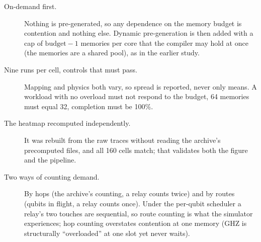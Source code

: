 \begin{description}
  \item[On-demand first.] Nothing is pre-generated, so any dependence on the memory budget is contention and nothing else. Dynamic pre-generation is then added with a cap of $\text{budget}-1$ memories per core that the compiler may hold at once (the memories are a shared pool), as in the earlier study.
  \item[Nine runs per cell, controls that must pass.] Mapping and physics both vary, so spread is reported, never only means. A workload with no overload must not respond to the budget, 64 memories must equal 32, completion must be 100\%.
  \item[The heatmap recomputed independently.] It was rebuilt from the raw traces without reading the archive's precomputed files, and all 160 cells match; that validates both the figure and the pipeline.
  \item[Two ways of counting demand.] By hops (the archive's counting, a relay counts twice) and by routes (qubits in flight, a relay counts once). Under the per-qubit scheduler a relay's two touches are sequential, so route counting is what the simulator experiences; hop counting overstates contention at one memory (GHZ is structurally ``overloaded'' at one slot yet never waits).
\end{description}

